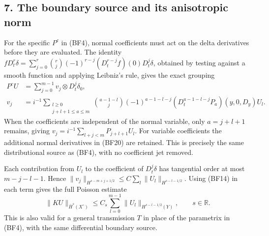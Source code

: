 \documentclass[
  11pt,
]{article}
\begin{document}
\subsection{7. The boundary source and its anisotropic
norm}\label{the-boundary-source-and-its-anisotropic-norm}

For the specific \(P^c\) in (BF4), normal coefficients must act on the
delta derivatives before they are evaluated. The identity
\(fD_t^r\delta=\sum_{j=0}^r\binom rj(-1)^{r-j}(D_t^{r-j}f)(0)D_t^j\delta\),
obtained by testing against a smooth function and applying Leibniz's
rule, gives the exact grouping \[
\begin{split}
 P^cU&=\sum_{j=0}^{m-1}v_j\otimes D_t^j\delta_0,\\
 v_j&=i^{-1}\sum_{\substack{l\geq0\\j+l+1\leq a\leq m}}
 \binom{a-1-l}{j}(-1)^{a-1-l-j}
 (D_t^{a-1-l-j}P_a)(y,0,D_y)U_l.
\end{split}
 \tag{BF20}
\] When the coefficients are independent of the normal variable, only
\(a=j+l+1\) remains, giving \(v_j=i^{-1}\sum_{l+j<m}P_{j+l+1}U_l\). For
variable coefficients the additional normal derivatives in (BF20) are
retained. This is precisely the same distributional source as (BF4),
with no coefficient jet removed.

Each contribution from \(U_l\) to the coefficient of \(D_t^j\delta\) has
tangential order at most \(m-j-l-1\). Hence
\(\|v_j\|_{H^{s-m+j+1/2}}\leq C\sum_l\|U_l\|_{H^{s-l-1/2}}\). Using
(BF14) in each term gives the full Poisson estimate \[
 \|KU\|_{\bar H^s(X^\circ)}
 \leq C_s\sum_{l=0}^{m-1}\|U_l\|_{H^{s-l-1/2}(Y)},
 \qquad s\in\mathbb R.
 \tag{BF21}
\] This is also valid for a general transmission \(T\) in place of the
parametrix in (BF4), with the same differential boundary source.
\end{document}
